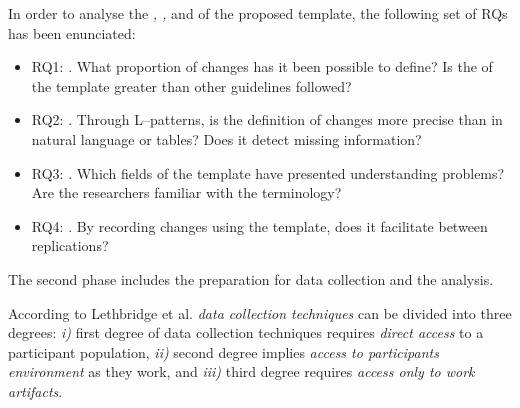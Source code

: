 In order to analyse the \emph{\expressiveness, \precision, \usability} and \emph{\traceability} of the proposed template, the following set of \gls{RQs} has been enunciated: 
   
\begin{itemize}
    \item RQ1: \emph{\Expressiveness}. What proportion of changes has it been possible to define?
    Is the \expressiveness of the template greater than other guidelines followed?

    \item RQ2: \emph{\Precision}. Through L--patterns, is the definition of changes more precise than in natural language or tables? Does it detect missing information?

    \item RQ3: \emph{\Usability}. Which fields of the template have presented understanding problems?
    Are the researchers familiar with the terminology? 
   
    \item RQ4: \emph{\Traceability}. By recording changes using the template, does it facilitate \emph{\traceability} between replications?
        
\end{itemize}
   

The second phase includes the preparation for data collection and the analysis.


According to Lethbridge et al. \cite{lethbridge2005studying} \emph{data collection techniques} can be divided into three degrees: \emph{i)} first degree of data collection techniques requires \emph{direct access} to a participant population, \emph{ii)} second degree implies \emph{access to participants environment} as they work, and \emph{iii)} third degree requires \emph{access only to work artifacts}. 
    
